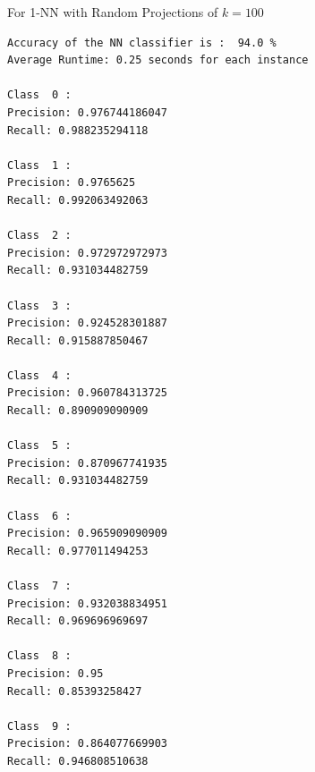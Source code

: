 For 1-NN with Random Projections of $k=100$

\begin{lstlisting}[frame=single]
Accuracy of the NN classifier is :  94.0 %
Average Runtime: 0.25 seconds for each instance

Class  0 :
Precision: 0.976744186047
Recall: 0.988235294118

Class  1 :
Precision: 0.9765625
Recall: 0.992063492063

Class  2 :
Precision: 0.972972972973
Recall: 0.931034482759

Class  3 :
Precision: 0.924528301887
Recall: 0.915887850467

Class  4 :
Precision: 0.960784313725
Recall: 0.890909090909

Class  5 :
Precision: 0.870967741935
Recall: 0.931034482759

Class  6 :
Precision: 0.965909090909
Recall: 0.977011494253

Class  7 :
Precision: 0.932038834951
Recall: 0.969696969697

Class  8 :
Precision: 0.95
Recall: 0.85393258427

Class  9 :
Precision: 0.864077669903
Recall: 0.946808510638
\end{lstlisting}


